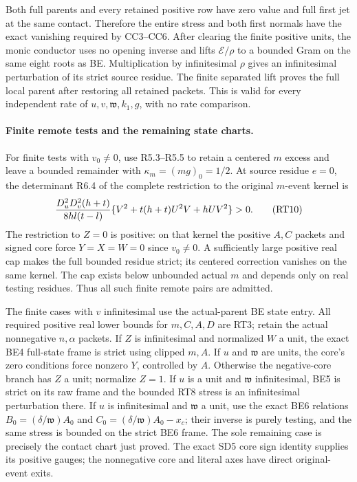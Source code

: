 Both full parents and every retained positive row have zero value and
full first jet at the same contact. Therefore the entire stress and
both first normals have the exact vanishing required by CC3--CC6.
After clearing the finite positive units, the monic conductor uses no
opening inverse and lifts $\mathscr E/\rho$ to a bounded Gram on the
same eight roots as BE. Multiplication by infinitesimal $\rho$ gives
an infinitesimal perturbation of its strict source residue. The finite
separated lift proves the full local parent after restoring all
retained packets. This is valid for every independent rate of
$u,v,\mathfrak w,k_1,g$, with no rate comparison.

\paragraph{Finite remote tests and the remaining state charts.}
For finite tests with $v_0\ne0$, use R5.3--R5.5 to retain a centered
$m$ excess and leave a bounded remainder with $\kappa_m=(mg)_0=1/2$.
At source residue $e=0$, the determinant R6.4 of the complete
restriction to the original $m$-event kernel is
\[
 {D_u^2D_v^2(h+t)\over8hl(t-l)}
 \{V^2+t(h+t)U^2V+hUV^2\}>0.                       \tag{RT10}
\]
The restriction to $Z=0$ is positive: on that kernel the positive
$A,C$ packets and signed core force $Y=X=W=0$ since $v_0\ne0$.
A sufficiently large positive real cap makes the full bounded residue
strict; its centered correction vanishes on the same kernel. The cap
exists below unbounded actual $m$ and depends only on real testing
residues. Thus all such finite remote pairs are admitted.

The finite cases with $v$ infinitesimal use the actual-parent BE state
entry. All required positive real lower bounds for $m,C,A,D$ are RT3;
retain the actual nonnegative $n,\alpha$ packets. If $Z$ is infinitesimal
and normalized $W$ a unit, the exact BE4 full-state frame is strict
using clipped $m,A$. If $u$ and $\mathfrak w$ are units, the core's
zero conditions force nonzero $Y$, controlled by $A$. Otherwise the
negative-core branch has $Z$ a unit; normalize $Z=1$. If $u$ is a unit
and $\mathfrak w$ infinitesimal, BE5 is strict on its raw frame and
the bounded RT8 stress is an infinitesimal perturbation there. If $u$
is infinitesimal and $\mathfrak w$ a unit, use the exact BE6 relations
$B_0=(\delta/\mathfrak w)A_0$ and
$C_0=(\delta/\mathfrak w)A_0-x_c$; their inverse is purely testing,
and the same stress is bounded on the strict BE6 frame. The sole
remaining case is precisely the contact chart just proved. The exact
SD5 core sign identity supplies its positive gauges; the nonnegative
core and literal axes have direct original-event exits.

